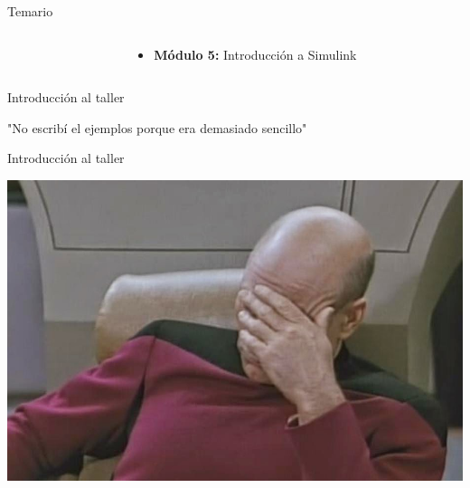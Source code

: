 \documentclass{bredelebeamer}
\begin{document}
\begin{frame}{Temario}
\begin{columns}
\begin{column}{0.3\textwidth}
\begin{center}
\end{center}
\end{column}
\begin{column}{0.5\textwidth}
\begin{itemize}
\item \textbf{Módulo 5:} Introducción a Simulink
\end{itemize}
\end{column}
\end{columns}
\end{frame}

\begin{frame}{Introducción al taller}
\begin{large}
\begin{center}
"No escribí el ejemplos porque era demasiado sencillo"
\end{center}
\end{large}
\end{frame}

\begin{frame}{Introducción al taller}
\begin{large}
\begin{center}
\includegraphics[scale=0.27]{images/img42.jpg}
\end{center}
\end{large}
\end{frame}
\end{document}

